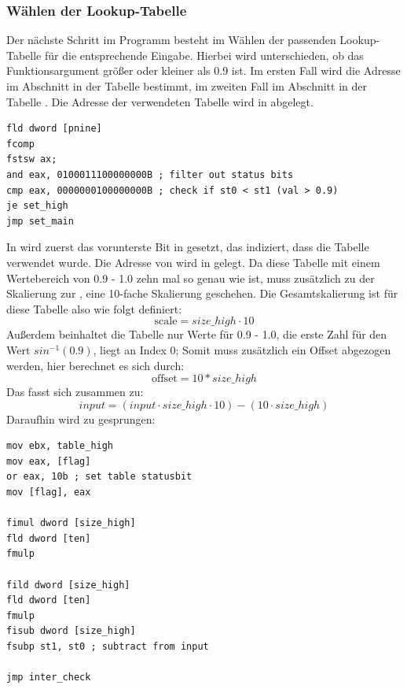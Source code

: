 \documentclass{article}
\begin{document}
\subsubsection{Wählen der Lookup-Tabelle}

	Der nächste Schritt im Programm besteht im 
	Wählen der passenden Lookup-Tabelle 
	für die entsprechende Eingabe. Hierbei wird
	unterschieden, ob das Funktionsargument größer oder kleiner
	als 0.9 ist. Im ersten Fall wird die Adresse im Abschnitt
	 in der Tabelle  bestimmt,
	im zweiten Fall im Abschnitt  in der Tabelle
	. Die Adresse der verwendeten Tabelle wird
	in  abgelegt.
	

\vspace{0.5cm}

\begin{lstlisting}
fld dword [pnine]
fcomp
fstsw ax;
and eax, 0100011100000000B ; filter out status bits
cmp eax, 0000000100000000B ; check if st0 < st1 (val > 0.9)
je set_high
jmp set_main
\end{lstlisting}

\vspace{0.5cm}

	In  wird zuerst das vorunterste Bit in
	 gesetzt, das indiziert, dass die Tabelle
	 verwendet wurde. Die Adresse von
	 wird in  gelegt.
	Da diese Tabelle mit einem Wertebereich von 0.9 - 1.0
	zehn mal so genau wie  ist, muss zusätzlich
	zu der Skalierung zur , eine 10-fache Skalierung geschehen.
	Die Gesamtskalierung ist für diese Tabelle also wie folgt definiert:
	\[\textrm{scale} = size\_high \cdot 10\]
	Außerdem beinhaltet die Tabelle nur Werte für 0.9 - 1.0, 
	die erste Zahl für den Wert $sin^{-1}(0.9)$, liegt an Index 0;
	Somit muss zusätzlich ein Offset abgezogen werden, hier berechnet es sich durch:
	\[\textrm{offset} = 10 * size\_high\]
	Das fasst sich zusammen zu:
	\[input = (input \cdot size\_high \cdot 10)-(10 \cdot size\_high)\]
	Daraufhin wird zu
	 gesprungen:

\vspace{0.5cm}

\begin{lstlisting}
mov ebx, table_high
mov eax, [flag]
or eax, 10b ; set table statusbit
mov [flag], eax

fimul dword [size_high]
fld dword [ten]
fmulp

fild dword [size_high]
fld dword [ten]
fmulp
fisub dword [size_high]
fsubp st1, st0 ; subtract from input

jmp inter_check
\end{lstlisting}
\newpage %
\vspace{0.5cm}
\end{document}
